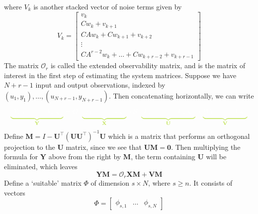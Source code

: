 \documentclass[11pt]{report} %
\begin{document}
where $V_{k}$ is another stacked vector of noise terms given by
\begin{equation}
V_{k} = \begin{bmatrix}
v_{k} \\ Cw_{k} + v_{k + 1} \\ CAw_{k} + Cw_{k + 1} + v_{k + 2} \\ \vdots \\ CA^{r - 2}w_{k} + \dots + Cw_{k + r - 2} + v_{k + r - 1}
\end{bmatrix}
\end{equation}
The matrix $\mathcal{O}_{r}$ is called the extended observability matrix, and is the matrix of interest in the first step of estimating the system matrices. Suppose we have $N + r - 1$ input and output observations, indexed by $\left(u_{1}, y_{1}\right), \dots, \left(u_{N + r - 1}, y_{N + r - 1}\right)$. Then concatenating horizontally, we can write
\begin{equation}
\green\underbrace{
\black\begin{bmatrix}
Y_{r, 1} & \dots & Y_{r, N}
\end{bmatrix}}_{\green \mathbf{Y}}\black = \mathcal{O}_{r}\green\underbrace{\black\begin{bmatrix}
x_{1} & \dots & x_{N}
\end{bmatrix}}_{\green \mathbf{X}}\black + \mathcal{S}_{r}\green\underbrace{\black\begin{bmatrix}
U_{r, 1} & \dots & U_{r, N}
\end{bmatrix}}_{\green \mathbf{U}}\black + \green\underbrace{\black\begin{bmatrix}
V_{1} & \dots & V_{N}
\end{bmatrix}}_{\green \mathbf{V}}\black
\end{equation}
Define $\mathbf{M} = I - \mathbf{U}^{\top}\left(\mathbf{U}\mathbf{U}^{\top}\right)^{-1}\mathbf{U}$ which is a matrix that performs an orthogonal projection to the $\mathbf{U}$ matrix, since we see that $\mathbf{U}\mathbf{M} = \mathbf{0}$. Then multiplying the formula for $\mathbf{Y}$ above from the right by $\mathbf{M}$, the term containing $\mathbf{U}$ will be eliminated, which leaves
\begin{equation}
\mathbf{Y}\mathbf{M} = \mathcal{O}_{r}\mathbf{X}\mathbf{M} + \mathbf{V}\mathbf{M}
\end{equation}
Define a `suitable' matrix $\Phi$ of dimension $s \times N$, where $s \geq n$. It consists of vectors
\begin{equation}
\Phi = \begin{bmatrix}
\phi_{s, 1} & \dots & \phi_{s, N}
\end{bmatrix}
\end{equation}
\end{document}
